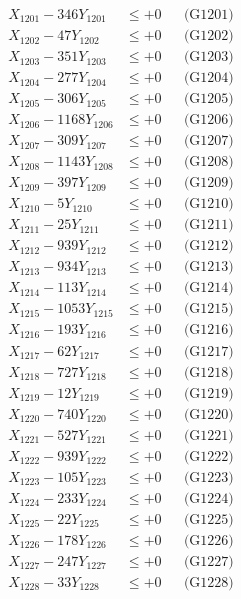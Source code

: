 \documentclass[a4paper,10pt]{article}
\begin{document}
{\begin{align}
\allowbreak
X_{1201} - 346Y_{1201} &\leq +0 && \text{(G1201)} \\
X_{1202} - 47Y_{1202} &\leq +0 && \text{(G1202)} \\
X_{1203} - 351Y_{1203} &\leq +0 && \text{(G1203)} \\
X_{1204} - 277Y_{1204} &\leq +0 && \text{(G1204)} \\
X_{1205} - 306Y_{1205} &\leq +0 && \text{(G1205)} \\
X_{1206} - 1168Y_{1206} &\leq +0 && \text{(G1206)} \\
X_{1207} - 309Y_{1207} &\leq +0 && \text{(G1207)} \\
X_{1208} - 1143Y_{1208} &\leq +0 && \text{(G1208)} \\
X_{1209} - 397Y_{1209} &\leq +0 && \text{(G1209)} \\
X_{1210} - 5Y_{1210} &\leq +0 && \text{(G1210)} \\
\allowbreak
X_{1211} - 25Y_{1211} &\leq +0 && \text{(G1211)} \\
X_{1212} - 939Y_{1212} &\leq +0 && \text{(G1212)} \\
X_{1213} - 934Y_{1213} &\leq +0 && \text{(G1213)} \\
X_{1214} - 113Y_{1214} &\leq +0 && \text{(G1214)} \\
X_{1215} - 1053Y_{1215} &\leq +0 && \text{(G1215)} \\
X_{1216} - 193Y_{1216} &\leq +0 && \text{(G1216)} \\
X_{1217} - 62Y_{1217} &\leq +0 && \text{(G1217)} \\
X_{1218} - 727Y_{1218} &\leq +0 && \text{(G1218)} \\
X_{1219} - 12Y_{1219} &\leq +0 && \text{(G1219)} \\
X_{1220} - 740Y_{1220} &\leq +0 && \text{(G1220)} \\
\allowbreak
X_{1221} - 527Y_{1221} &\leq +0 && \text{(G1221)} \\
X_{1222} - 939Y_{1222} &\leq +0 && \text{(G1222)} \\
X_{1223} - 105Y_{1223} &\leq +0 && \text{(G1223)} \\
X_{1224} - 233Y_{1224} &\leq +0 && \text{(G1224)} \\
X_{1225} - 22Y_{1225} &\leq +0 && \text{(G1225)} \\
X_{1226} - 178Y_{1226} &\leq +0 && \text{(G1226)} \\
X_{1227} - 247Y_{1227} &\leq +0 && \text{(G1227)} \\
X_{1228} - 33Y_{1228} &\leq +0 && \text{(G1228)} \\

\end{align}}
\end{document}

